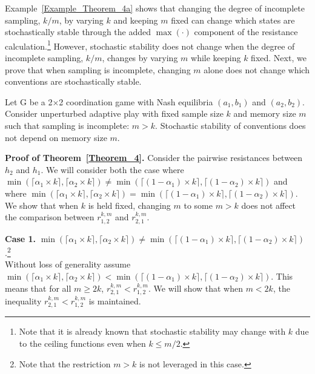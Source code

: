 Example~\ref{Example_Theorem_4a} shows that changing the degree of incomplete sampling, $k/m$, by varying $k$ and keeping $m$ fixed can change which states are stochastically stable through the added $\max(\cdot)$ component of the resistance calculation.\footnote{Note that it is already known that stochastic stability may change with $k$ due to the ceiling functions even when $k \leq m/2$.} However, stochastic stability does not change when the degree of incomplete sampling, $k/m$, changes by varying $m$ while keeping $k$ fixed. Next, we prove that when sampling is incomplete, changing $m$ alone does not change which conventions are stochastically stable.

\begin{theorem}\label{Theorem_4}
Let G be a 2$\times$2 coordination game with Nash equilibria $(a_1,b_1)$ and $(a_2,b_2)$. 
Consider unperturbed adaptive play with fixed sample size $k$ and memory size $m$ such that sampling is incomplete: $m > k$. 
Stochastic stability of conventions does not depend on memory size $m$.
\end{theorem}

\textbf{Proof of Theorem~\ref{Theorem_4}.} 
Consider the pairwise resistances between $h_2$ and $h_1$. We will consider both the case where $\min(\lceil \alpha_1 \times k \rceil,\lceil \alpha_2 \times k \rceil) \neq \min(\lceil (1-\alpha_1) \times k \rceil,\lceil (1-\alpha_2) \times k \rceil)$ and where $\min(\lceil \alpha_1 \times k \rceil,\lceil \alpha_2 \times k \rceil) = \min(\lceil (1-\alpha_1) \times k \rceil,\lceil (1-\alpha_2) \times k \rceil)$. We show that when $k$ is held fixed, changing $m$ to some $m>k$ does not affect the comparison between $r_{1,2}^{k,m}$ and $r_{2,1}^{k,m}$.

{\bf Case 1.} $\min(\lceil \alpha_1 \times k \rceil,\lceil \alpha_2 \times k \rceil) \neq \min(\lceil (1-\alpha_1) \times k \rceil,\lceil (1-\alpha_2) \times k \rceil)$.\footnote{Note that the restriction $m>k$ is not leveraged in this case.}  \\ 
Without loss of generality assume $\min(\lceil \alpha_1 \times k \rceil,\lceil \alpha_2 \times k \rceil) < \min(\lceil (1-\alpha_1) \times k \rceil,\lceil (1-\alpha_2) \times k \rceil)$. This means that for all $m \geq 2k$, $r^{k,m}_{2,1} < r^{k,m}_{1,2}$. We will show that when $m < 2k$, the inequality $r^{k,m}_{2,1} < r^{k,m}_{1,2}$ is maintained.

